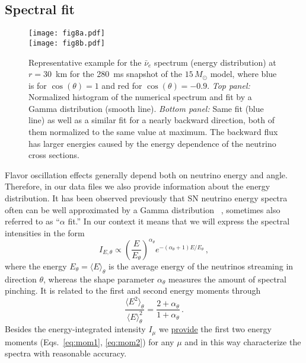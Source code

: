 \documentclass[iop,twocolappendix,numberedappendix]{emulateapj}
\begin{document}
\subsection{Spectral fit}
\begin{figure}
\begin{center}
 \texttt{[image: fig8a.pdf]}\\
\texttt{[image: fig8b.pdf]}
  \caption{Representative example for the $\bar{\nu}_e$ spectrum (energy distribution) at
  $r=30$~km for the 280~ms snapshot of the $15\,M_\odot$ model, where blue
  is for $\cos(\theta)=1$ and red for $\cos(\theta)=-0.9$.
  {\em Top panel:} Normalized histogram of the numerical spectrum and
  fit by a Gamma distribution (smooth line).
  {\em Bottom panel:} Same fit (blue line) as well as a similar fit
  for a nearly backward direction, both of them normalized to the same value
  at maximum. The backward flux has larger energies caused by the energy
  dependence of the neutrino cross sections.}
   \label{fig:alpha_fit}
\end{center}
\end{figure}

Flavor oscillation effects generally depend both on neutrino energy and
angle. Therefore, in our data files we also provide information about the
energy distribution. It has been observed previously that SN neutrino energy
spectra often can be well approximated by a Gamma distribution
~\citep{Keil:2002in,Tamborra:2012ac}, sometimes also referred to as ``$\alpha$
fit.'' In our context it means that we will express the spectral intensities
in the form 
\begin{equation}
\label{eq:alphafit}
I_{E,\theta}\propto \left(\frac{E}{E_\theta}\right)^{\alpha_\theta}
e^{-(\alpha_\theta+1) E/E_\theta}\,,
\end{equation}
where the energy $E_\theta=\langle E\rangle_\theta$ is the average
energy of the neutrinos streaming in direction $\theta$, whereas the shape
parameter $\alpha_\theta$ measures the amount of spectral pinching. It is
related to the first and second energy moments through
\begin{equation}
\frac{\langle E^2\rangle_\theta}{\langle E\rangle_\theta^2} =
\frac{2+\alpha_\theta}{1+\alpha_\theta}\,.
\end{equation}
Besides the energy-integrated intensity $I_\mu$ we \href{http://wwwmpa.mpa-garching.mpg.de/ccsnarchive/data/Tamborra2017/}
{provide}
the first two energy moments (Eqs.~\ref{eq:mom1}, \ref{eq:mom2})
for any $\mu$ and in this way characterize the spectra with
reasonable accuracy.
\end{document}
